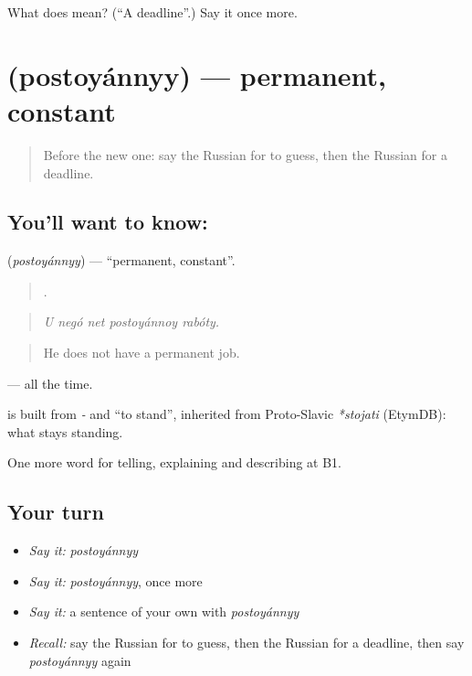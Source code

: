 \begin{tcolorbox}[breakable,colback=teal!4,colframe=teal!35!black,title={Before you move on}]
What does  mean? (\textquotedblleft{}A deadline\textquotedblright{}.) Say it once more.
\end{tcolorbox}
\section[\texorpdfstring{\ru{постоянный} (postoyánnyy)}{постоянный (postoyánnyy)}]{ (postoyánnyy) — permanent, constant}

\label{lesson:RU-C380-postoyannyy}



\begin{quote}
Before the new one: say the Russian for to guess, then the Russian for a deadline.
\end{quote}

\subsection*{You'll want to know: }
\textbf{} (\emph{postoyánnyy}) — \textquotedblleft{}permanent, constant\textquotedblright{}.

\begin{quote}
    .
\end{quote}

\begin{quote}
\emph{U negó net postoyánnoy rabóty.}
\end{quote}

\begin{quote}
He does not have a permanent job.
\end{quote}

\emph{} — all the time.

\begin{cousinweb}
\textbf{} is built from \emph{-} and \emph{} \textquotedblleft{}to stand\textquotedblright{}, inherited from Proto-Slavic \emph{*stojati} (EtymDB): what stays standing.
\end{cousinweb}

\begin{grammarlens}[title={What you've built}]
One more word for telling, explaining and describing at B1.
\end{grammarlens}

\subsection*{Your turn}
\begin{itemize}
\raggedright
  \item \emph{Say it:} \emph{postoyánnyy}
  \item \emph{Say it:} \emph{postoyánnyy}, once more
  \item \emph{Say it:} a sentence of your own with \emph{postoyánnyy}
  \item \emph{Recall:} say the Russian for to guess, then the Russian for a deadline, then say \emph{postoyánnyy} again
\end{itemize}


